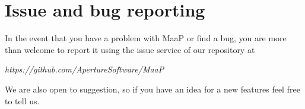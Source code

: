 \section{Issue and bug reporting}
In the event that you have a problem with MaaP or find a bug, you are more than welcome to report it using the issue service of our repository at

\begin{center}
\textit{https://github.com/ApertureSoftware/MaaP}
\end{center}

We are also open to suggestion, so if you have an idea for a new features feel free to tell us.







